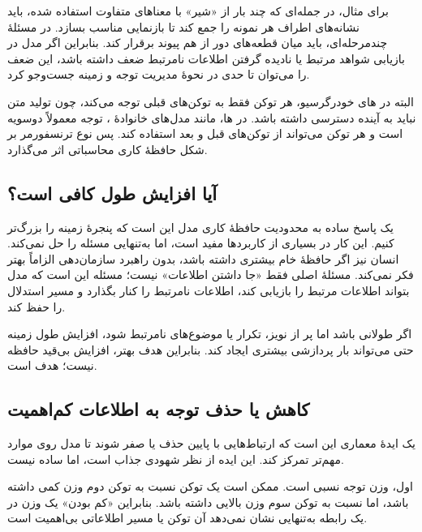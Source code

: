 برای مثال، در جمله‌ای که چند بار از «شیر» با معناهای متفاوت استفاده شده،  باید نشانه‌های اطراف هر نمونه را جمع کند تا بازنمایی مناسب بسازد. در مسئلهٔ چندمرحله‌ای،  باید میان قطعه‌های دور از هم پیوند برقرار کند. بنابراین اگر مدل در بازیابی شواهد مرتبط یا نادیده گرفتن اطلاعات نامرتبط ضعف داشته باشد، این ضعف را می‌توان تا حدی در نحوهٔ مدیریت توجه و زمینه جست‌وجو کرد.

البته در های خودرگرسیو، هر توکن فقط به توکن‌های قبلی توجه می‌کند، چون تولید متن نباید به آینده دسترسی داشته باشد. در ها، مانند مدل‌های خانوادهٔ ، توجه معمولاً دوسویه است و هر توکن می‌تواند از توکن‌های قبل و بعد استفاده کند. پس نوع ترنسفورمر بر شکل حافظهٔ کاری محاسباتی اثر می‌گذارد.


\subsection{آیا افزایش طول  کافی است؟}
یک پاسخ ساده به محدودیت حافظهٔ کاری مدل این است که پنجرهٔ زمینه را بزرگ‌تر کنیم. این کار در بسیاری از کاربردها مفید است، اما به‌تنهایی مسئله را حل نمی‌کند. انسان نیز اگر حافظهٔ خام بیشتری داشته باشد، بدون راهبرد سازمان‌دهی الزاماً بهتر فکر نمی‌کند. مسئلهٔ اصلی فقط «جا داشتن اطلاعات» نیست؛ مسئله این است که مدل بتواند اطلاعات مرتبط را بازیابی کند، اطلاعات نامرتبط را کنار بگذارد و مسیر استدلال را حفظ کند.

اگر  طولانی باشد اما پر از نویز، تکرار یا موضوع‌های نامرتبط شود، افزایش طول زمینه حتی می‌تواند بار پردازشی بیشتری ایجاد کند. بنابراین هدف بهتر، افزایش بی‌قید حافظه نیست؛ هدف  است.

\subsection{کاهش یا حذف توجه به اطلاعات کم‌اهمیت}
یک ایدهٔ معماری این است که ارتباط‌هایی با  پایین حذف یا صفر شوند تا مدل روی موارد مهم‌تر تمرکز کند. این ایده از نظر شهودی جذاب است، اما ساده نیست.

اول، وزن توجه نسبی است. ممکن است یک توکن نسبت به توکن دوم وزن کمی داشته باشد، اما نسبت به توکن سوم وزن بالایی داشته باشد. بنابراین «کم بودن» یک وزن در یک رابطه به‌تنهایی نشان نمی‌دهد آن توکن یا مسیر اطلاعاتی بی‌اهمیت است.

